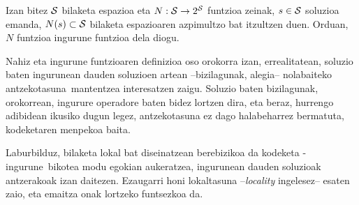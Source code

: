 \documentclass[eu]{ifirak}\usepackage[]{graphicx}\usepackage[]{color}
\newcommand{\zkk}{\guillemotleft}
\newcommand{\skk}{\guillemotright}
\begin{document}
\begin{ifdefinition}
Izan bitez $\cal S$ bilaketa espazioa eta $N:{\cal S} \rightarrow 2^{\cal S}$ funtzioa zeinak, $s\in {\cal S}$ soluzioa emanda, $N(s)\subset {\cal S}$ bilaketa espazioaren azpimultzo bat itzultzen duen. Orduan, $N$ funtzioa ingurune funtzioa dela diogu.
\end{ifdefinition}

Nahiz eta ingurune funtzioaren definizioa oso orokorra izan, errealitatean, soluzio baten ingurunean dauden soluzioen artean --bizilagunak, alegia-- nolabaiteko \zkk antzekotasuna\skk\ mantentzea interesatzen zaigu. Soluzio baten bizilagunak, orokorrean, ingurure operadore baten bidez lortzen dira, eta beraz, hurrengo adibidean ikusiko dugun legez, antzekotasuna ez dago halabeharrez bermatuta, kodeketaren menpekoa baita.

Laburbilduz, bilaketa lokal bat diseinatzean berebizikoa da \zkk kodeketa - ingurune\skk\ bikotea modu egokian aukeratzea, ingurunean dauden soluzioak antzerakoak izan daitezen. Ezaugarri honi lokaltasuna --\textit{locality} ingelesez-- esaten zaio, eta emaitza onak lortzeko funtsezkoa da.
\end{document}
